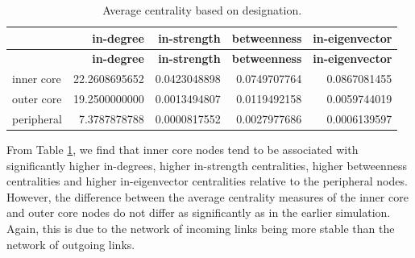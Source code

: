 \documentclass[12pt,letterpaper]{report}
\begin{document}
	\begin{longtable}{|l|r|r|r|r|}
		\caption{Average centrality based on designation. \label{tab:tab08AverageCentrality}} \\
		\hline
		& \textbf{\small in-degree} & \textbf{\small in-strength} & \textbf{\small betweenness} &
		\textbf{\small in-eigenvector} \\ 
		\hline
		\endfirsthead
		\hline
		& \textbf{\small in-degree} & \textbf{\small in-strength} & \textbf{\small betweenness} &
		\textbf{\small in-eigenvector} \\ 
		\hline
		\endhead
		\hline
		\endfoot
		inner core & 22.2608695652 & 0.0423048898 & 0.0749707764 & 0.0867081455 \\
		outer core & 19.2500000000 & 0.0013494807 & 0.0119492158 & 0.0059744019 \\
		peripheral & 7.3787878788 & 0.0000817552 & 0.0027977686 & 0.0006139597 \\
	\end{longtable}
	
	From Table \ref{tab:tab08AverageCentrality}, we find that inner core nodes tend to be associated with significantly higher in-degrees, higher in-strength centralities, higher betweenness centralities and higher in-eigenvector centralities relative to the peripheral nodes. However, the difference between the average centrality measures of the inner core and outer core nodes do not differ as significantly as in the earlier simulation. Again, this is due to the network of incoming links being more stable than the network of outgoing links.
	
\end{document}
